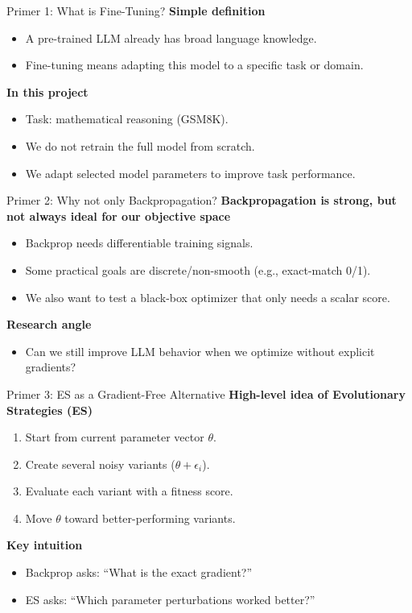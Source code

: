 \documentclass[aspectratio=169,11pt]{beamer}
\begin{document}
\begin{frame}{Primer 1: What is Fine-Tuning?}
\textbf{Simple definition}
\begin{itemize}
  \item A pre-trained LLM already has broad language knowledge.
  \item Fine-tuning means adapting this model to a specific task or domain.
\end{itemize}

\textbf{In this project}
\begin{itemize}
  \item Task: mathematical reasoning (GSM8K).
  \item We do not retrain the full model from scratch.
  \item We adapt selected model parameters to improve task performance.
\end{itemize}
\end{frame}

\begin{frame}{Primer 2: Why not only Backpropagation?}
\textbf{Backpropagation is strong, but not always ideal for our objective space}
\begin{itemize}
  \item Backprop needs differentiable training signals.
  \item Some practical goals are discrete/non-smooth (e.g., exact-match 0/1).
  \item We also want to test a black-box optimizer that only needs a scalar score.
\end{itemize}

\textbf{Research angle}
\begin{itemize}
  \item Can we still improve LLM behavior when we optimize without explicit gradients?
\end{itemize}
\end{frame}

\begin{frame}{Primer 3: ES as a Gradient-Free Alternative}
\textbf{High-level idea of Evolutionary Strategies (ES)}
\begin{enumerate}
  \item Start from current parameter vector $\theta$.
  \item Create several noisy variants ($\theta + \epsilon_i$).
  \item Evaluate each variant with a fitness score.
  \item Move $\theta$ toward better-performing variants.
\end{enumerate}

\textbf{Key intuition}
\begin{itemize}
  \item Backprop asks: \enquote{What is the exact gradient?}
  \item ES asks: \enquote{Which parameter perturbations worked better?}
\end{itemize}
\end{frame}
\end{document}
